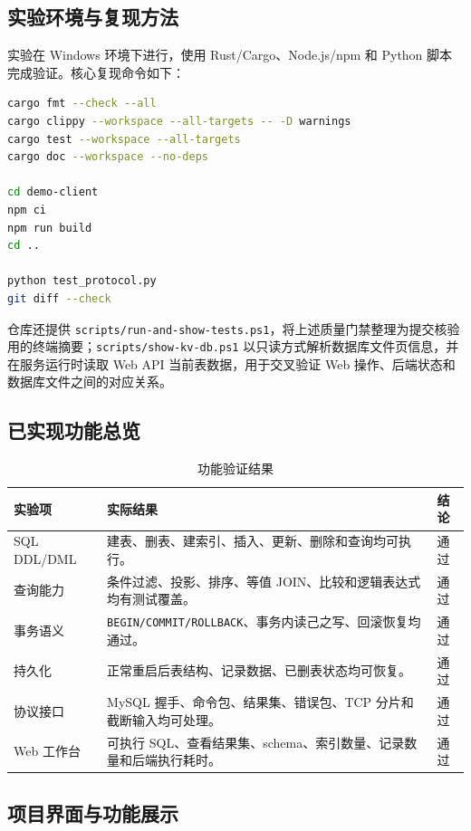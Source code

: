 \documentclass[UTF8,a4paper,12pt]{ctexart}
\newcommand{\code}[1]{\texttt{#1}}
\begin{document}
\subsection{实验环境与复现方法}

实验在 Windows 环境下进行，使用 Rust/Cargo、Node.js/npm 和 Python 脚本完成验证。核心复现命令如下：

\begin{lstlisting}[language=bash]
cargo fmt --check --all
cargo clippy --workspace --all-targets -- -D warnings
cargo test --workspace --all-targets
cargo doc --workspace --no-deps

cd demo-client
npm ci
npm run build
cd ..

python test_protocol.py
git diff --check
\end{lstlisting}

仓库还提供 \code{scripts/run-and-show-tests.ps1}，将上述质量门禁整理为提交核验用的终端摘要；\code{scripts/show-kv-db.ps1} 以只读方式解析数据库文件页信息，并在服务运行时读取 Web API 当前表数据，用于交叉验证 Web 操作、后端状态和数据库文件之间的对应关系。

\subsection{已实现功能总览}

\begin{table}[H]
\centering
\caption{功能验证结果}
\begin{tabularx}{\textwidth}{p{3.1cm}X p{1.6cm}}
\toprule
实验项 & 实际结果 & 结论\\
\midrule
SQL DDL/DML & 建表、删表、建索引、插入、更新、删除和查询均可执行。 & 通过\\
查询能力 & 条件过滤、投影、排序、等值 JOIN、比较和逻辑表达式均有测试覆盖。 & 通过\\
事务语义 & \code{BEGIN/COMMIT/ROLLBACK}、事务内读己之写、回滚恢复均通过。 & 通过\\
持久化 & 正常重启后表结构、记录数据、已删表状态均可恢复。 & 通过\\
协议接口 & MySQL 握手、命令包、结果集、错误包、TCP 分片和截断输入均可处理。 & 通过\\
Web 工作台 & 可执行 SQL、查看结果集、schema、索引数量、记录数量和后端执行耗时。 & 通过\\
\bottomrule
\end{tabularx}
\end{table}

\subsection{项目界面与功能展示}
\end{document}
